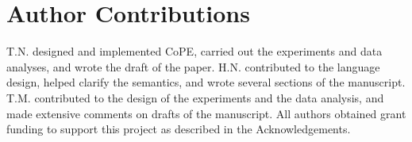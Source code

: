 \section*{Author Contributions}  
T.N. designed and implemented CoPE, carried out the experiments and
data analyses, and wrote the draft of the paper. H.N. contributed to
the language design, helped clarify the semantics, and wrote several
sections of the manuscript. T.M. contributed to the design of the
experiments and the data analysis, and made extensive comments on
drafts of the manuscript. All authors obtained grant funding to
support this project as described in the Acknowledgements.




